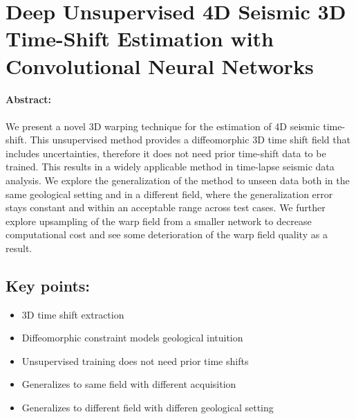 \section{Deep Unsupervised 4D Seismic 3D Time-Shift Estimation with Convolutional Neural Networks}

\paragraph{Abstract:} We present a novel 3D warping technique for the estimation of 4D seismic time-shift. This unsupervised method provides a diffeomorphic 3D time shift field that includes uncertainties, therefore it does not need prior time-shift data to be trained. This results in a widely applicable method in time-lapse seismic data analysis. We explore the generalization of the method to unseen data both in the same geological setting and in a different field, where the generalization error stays constant and within an acceptable range across test cases. We further explore upsampling of the warp field from a smaller network to decrease computational cost and see some deterioration of the warp field quality as a result.

\subsection*{Key points:}
\begin{itemize}
    \item 3D time shift extraction
    \item Diffeomorphic constraint models geological intuition
    \item Unsupervised training does not need prior time shifts
    \item Generalizes to same field with different acquisition
    \item Generalizes to different field with differen geological setting
\end{itemize}

{\vfill\hfill\newline{}}


